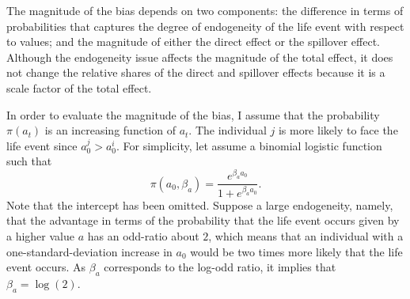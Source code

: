 The magnitude of the bias depends on two components: the difference in terms of probabilities that captures the degree of endogeneity of the life event with respect to values; and the magnitude of either the direct effect or the spillover effect. 
Although the endogeneity issue affects the magnitude of the total effect, it does not change the relative shares of the direct and spillover effects because it is a scale factor of the total effect.

In order to evaluate the magnitude of the bias, I assume that the probability $\pi(a_t)$ is an increasing function of $a_t$. The individual $j$ is more likely to face the life event since $a_0^j > a_0^i$. For simplicity, let assume a binomial logistic function such that
\begin{equation}
    \pi(a_0, \beta_a) = \frac{e^{\beta_a a_0}}{1 + e^{\beta_a a_0}}.
\end{equation}
Note that the intercept has been omitted. Suppose a large endogeneity, namely, that the advantage in terms of the probability that the life event occurs given by a higher value $a$ has an odd-ratio about $2$, which means that an individual with a one-standard-deviation increase in $a_0$ would be two times more likely that the life event occurs. As $\beta_a$ corresponds to the log-odd ratio, it implies that $\beta_a = \log(2)$. 

